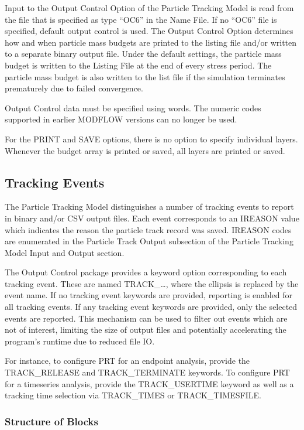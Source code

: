 Input to the Output Control Option of the Particle Tracking Model is read from the file that is specified as type ``OC6'' in the Name File. If no ``OC6'' file is specified, default output control is used. The Output Control Option determines how and when particle mass budgets are printed to the listing file and/or written to a separate binary output file.  Under the default settings, the particle mass budget is written to the Listing File at the end of every stress period.  The particle mass budget is also written to the list file if the simulation terminates prematurely due to failed convergence.

Output Control data must be specified using words.  The numeric codes supported in earlier MODFLOW versions can no longer be used.

For the PRINT and SAVE options, there is no option to specify individual layers.  Whenever the budget array is printed or saved, all layers are printed or saved.

\subsection{Tracking Events}

The Particle Tracking Model distinguishes a number of tracking events to report in binary and/or CSV output files. Each event corresponds to an IREASON value which indicates the reason the particle track record was saved. IREASON codes are enumerated in the Particle Track Output subsection of the Particle Tracking Model Input and Output section.

The Output Control package provides a keyword option corresponding to each tracking event. These are named TRACK\_\ldots, where the ellipsis is replaced by the event name. If no tracking event keywords are provided, reporting is enabled for all tracking events. If any tracking event keywords are provided, only the selected events are reported. This mechanism can be used to filter out events which are not of interest, limiting the size of output files and potentially accelerating the program's runtime due to reduced file IO.

For instance, to configure PRT for an endpoint analysis, provide the TRACK\_RELEASE and TRACK\_TERMINATE keywords. To configure PRT for a timeseries analysis, provide the TRACK\_USERTIME keyword as well as a tracking time selection via TRACK\_TIMES or TRACK\_TIMESFILE.

\vspace{5mm}
\subsubsection{Structure of Blocks}
\vspace{5mm}

